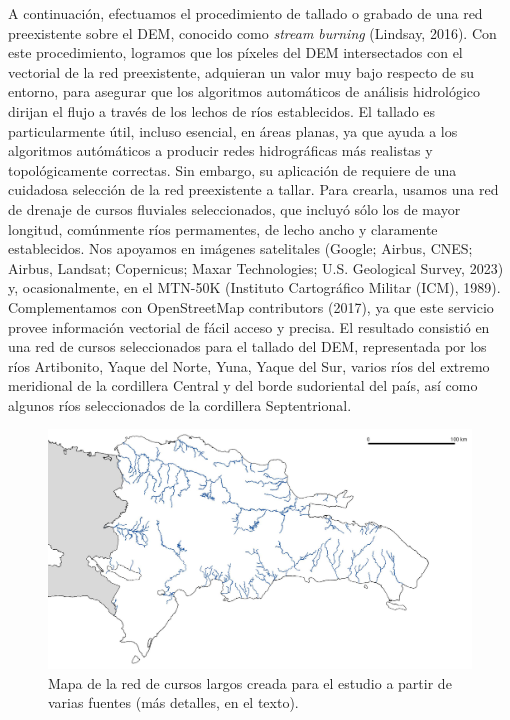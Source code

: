 \documentclass[spanish]{article}
\begin{document}
A continuación, efectuamos el procedimiento de tallado o grabado de una
red preexistente sobre el DEM, conocido como \emph{stream burning}
(Lindsay, 2016). Con este procedimiento, logramos que los píxeles del
DEM intersectados con el vectorial de la red preexistente, adquieran un
valor muy bajo respecto de su entorno, para asegurar que los algoritmos
automáticos de análisis hidrológico dirijan el flujo a través de los
lechos de ríos establecidos. El tallado es particularmente útil, incluso
esencial, en áreas planas, ya que ayuda a los algoritmos autómáticos a
producir redes hidrográficas más realistas y topológicamente correctas.
Sin embargo, su aplicación de requiere de una cuidadosa selección de la
red preexistente a tallar. Para crearla, usamos una red de drenaje de
cursos fluviales seleccionados, que incluyó sólo los de mayor longitud,
comúnmente ríos permamentes, de lecho ancho y claramente establecidos.
Nos apoyamos en imágenes satelitales (Google; Airbus, CNES; Airbus,
Landsat; Copernicus; Maxar Technologies; U.S. Geological Survey, 2023)
y, ocasionalmente, en el MTN-50K (Instituto Cartográfico Militar (ICM),
1989). Complementamos con OpenStreetMap contributors (2017), ya que este
servicio provee información vectorial de fácil acceso y precisa. El
resultado consistió en una red de cursos seleccionados para el tallado
del DEM, representada por los ríos Artibonito, Yaque del Norte, Yuna,
Yaque del Sur, varios ríos del extremo meridional de la cordillera
Central y del borde sudoriental del país, así como algunos ríos
seleccionados de la cordillera Septentrional.

\begin{figure}

{\centering \includegraphics[width=0.8\linewidth]{figuras/red-cursos-largos} 

}

\caption{Mapa de la red de cursos largos creada para el estudio a partir de varias fuentes (más detalles, en el texto).}\label{fig:redcursoslargos}
\end{figure}
\end{document}
